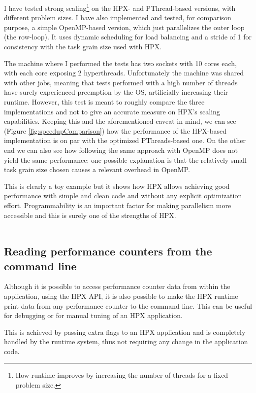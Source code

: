 I have tested strong scaling\footnote{How runtime improves by increasing the number of threads for a fixed problem size.} on the HPX- and PThread-based versions, with different problem sizes. I have also implemented and tested, for comparison purpose, a simple OpenMP-based version, which just parallelizes the outer loop (the row-loop). It uses dynamic scheduling for load balancing and a stride of 1 for consistency with the task grain size used with HPX.

The machine where I performed the tests has two sockets with 10 cores each, with each core exposing 2 hyperthreads. Unfortunately the machine was shared with other jobs, meaning that tests performed with a high number of threads have surely experienced preemption by the OS, artificially increasing their runtime.
However, this test is meant to roughly compare the three implementations and not to give an accurate measure on HPX's scaling capabilities. Keeping this and the aforementioned caveat in mind, we can see (Figure \ref{fig:speedupComparison}) how the performance of the HPX-based implementation is on par with the optimized PThreads-based one. On the other end we can also see how following the same approach with OpenMP does not yield the same performance: one possible explanation is that the relatively small task grain size chosen causes a relevant overhead in OpenMP.

This is clearly a toy example but it shows how HPX allows achieving good performance with simple and clean code and without any explicit optimization effort. Programmability is an important factor for making parallelism more accessible and this is surely one of the strengths of HPX.
~\\~

\subsection{Reading performance counters from the command line}
Although it is possible to access performance counter data from within the application, using the HPX API, it is also possible to make the HPX runtime print data from any performance counter to the command line. This can be useful for debugging or for manual tuning of an HPX application.

This is achieved by passing extra flags to an HPX application and is completely handled by the runtime system, thus not requiring any change in the application code.

